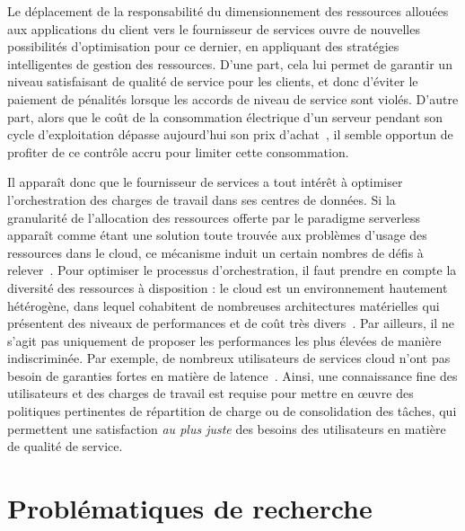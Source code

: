 Le déplacement de la responsabilité du dimensionnement des ressources allouées aux applications du client vers le fournisseur de services ouvre de nouvelles possibilités d'optimisation pour ce dernier, en appliquant des stratégies intelligentes de gestion des ressources. D'une part, cela lui permet de garantir un niveau satisfaisant de qualité de service pour les clients, et donc d'éviter le paiement de pénalités lorsque les accords de niveau de service sont violés. D'autre part, alors que le coût de la consommation électrique d'un serveur pendant son cycle d'exploitation dépasse aujourd'hui son prix d'achat~\cite{orgerieSurveyTechniquesImproving2014}, il semble opportun de profiter de ce contrôle accru pour limiter cette consommation. %

Il apparaît donc que le fournisseur de services a tout intérêt à optimiser l'orchestration des charges de travail dans ses centres de données. Si la granularité de l'allocation des ressources offerte par le paradigme serverless apparaît comme étant une solution toute trouvée aux problèmes d'usage des ressources dans le cloud, ce mécanisme induit un certain nombres de défis à relever~\cite{Lannurien2023}. Pour optimiser le processus d'orchestration, il faut prendre en compte la diversité des ressources à disposition : le cloud est un environnement hautement hétérogène, dans lequel cohabitent de nombreuses architectures matérielles qui présentent des niveaux de performances et de coût très divers~\cite{reissHeterogeneityDynamicityClouds}. Par ailleurs, il ne s'agit pas uniquement de proposer les performances les plus élevées de manière indiscriminée. Par exemple, de nombreux utilisateurs de services cloud n'ont pas besoin de garanties fortes en matière de latence~\cite{tirmaziBorgNextGeneration2020}. Ainsi, une connaissance fine des utilisateurs et des charges de travail est requise pour mettre en œuvre des politiques pertinentes de répartition de charge ou de consolidation des tâches, qui permettent une satisfaction \textit{au plus juste} des besoins des utilisateurs en matière de qualité de service.

\section{Problématiques de recherche}

